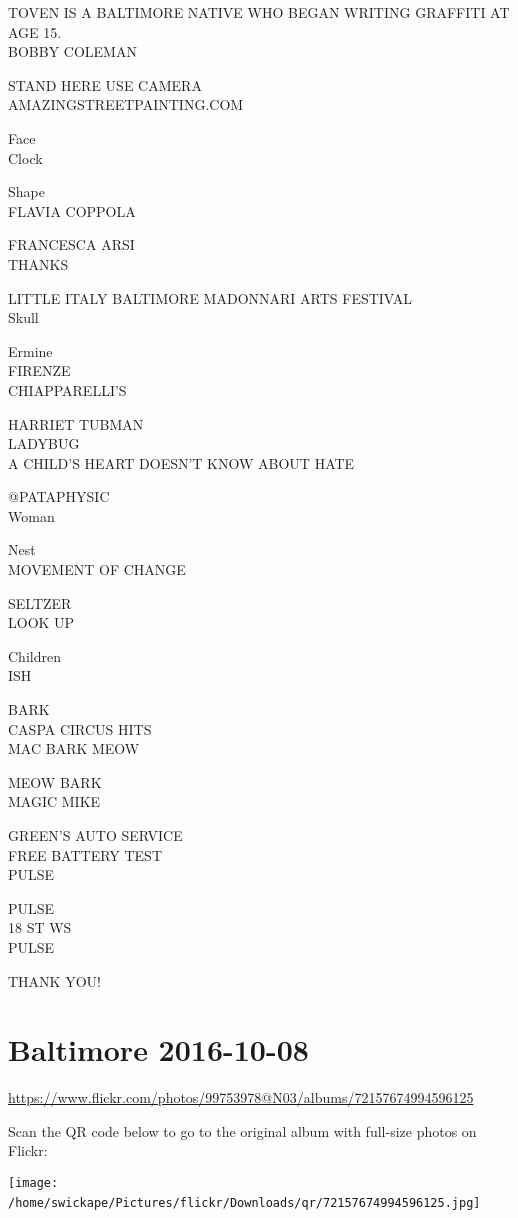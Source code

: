 \documentclass[10pt,letterpaper]{article}
\begin{document}
TOVEN IS A BALTIMORE NATIVE WHO BEGAN WRITING GRAFFITI AT AGE 15.\\
BOBBY COLEMAN

STAND HERE USE CAMERA\\
AMAZINGSTREETPAINTING.COM

Face\\
Clock

Shape\\
FLAVIA COPPOLA

FRANCESCA ARSI\\
THANKS

LITTLE ITALY BALTIMORE MADONNARI ARTS FESTIVAL\\
Skull

Ermine\\
FIRENZE\\
CHIAPPARELLI'S

HARRIET TUBMAN\\
LADYBUG\\
A CHILD'S HEART DOESN'T KNOW ABOUT HATE

@PATAPHYSIC\\
Woman

Nest\\
MOVEMENT OF CHANGE

SELTZER\\
LOOK UP

Children\\
ISH

BARK\\
CASPA CIRCUS HITS\\
MAC BARK MEOW

MEOW BARK\\
MAGIC MIKE

GREEN'S AUTO SERVICE\\
FREE BATTERY TEST\\
PULSE

PULSE\\
18 ST WS\\
PULSE

THANK YOU!
\

\section*{Baltimore 2016-10-08}

\url{https://www.flickr.com/photos/99753978@N03/albums/72157674994596125}

Scan the QR code below to go to the original album with full-size photos on Flickr:

\texttt{[image: /home/swickape/Pictures/flickr/Downloads/qr/72157674994596125.jpg]}
\
\end{document}
